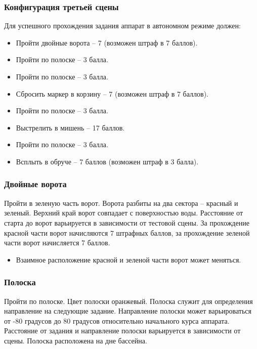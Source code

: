 
\subsubsection*{Конфигурация третьей сцены}


Для успешного прохождения задания аппарат в автономном режиме должен:

\begin{itemize}
    \item Пройти двойные ворота – 7 (возможен штраф в 7 баллов).
    \item Пройти по полоске – 3 балла.
    \item Пройти по полоске – 3 балла.
    \item Сбросить маркер в корзину – 7 (возможен штраф в 7 баллов).
    \item Пройти по полоске – 3 балла.
    \item Выстрелить в мишень – 17 баллов.
    \item Пройти по полоске – 3 балла.
    \item Всплыть в обруче – 7 баллов (возможен штраф в 3 балла).
\end{itemize}

\subsubsection*{Двойные ворота}


Пройти в зеленую часть ворот. Ворота разбиты на два сектора – красный и зеленый. Верхний край ворот совпадает с поверхностью воды. Расстояние от старта до ворот варьируется в зависимости от тестовой сцены. За прохождение красной части ворот начисляются 7 штрафных баллов, за прохождение зеленой части ворот начисляется 7 баллов.

\begin{itemize}
    \item Взаимное расположение красной и зеленой части ворот может меняться. 
\end{itemize}

\subsubsection*{Полоска}


Пройти по полоске. Цвет полоски оранжевый. Полоска служит для определения направление на следующие задание. Направление полоски может варьироваться от   -80 градусов до 80 градусов относительно начального курса аппарата. Расстояние от задания и направление полоски варьируется в зависимости от сцены. Полоска расположена на дне бассейна.

